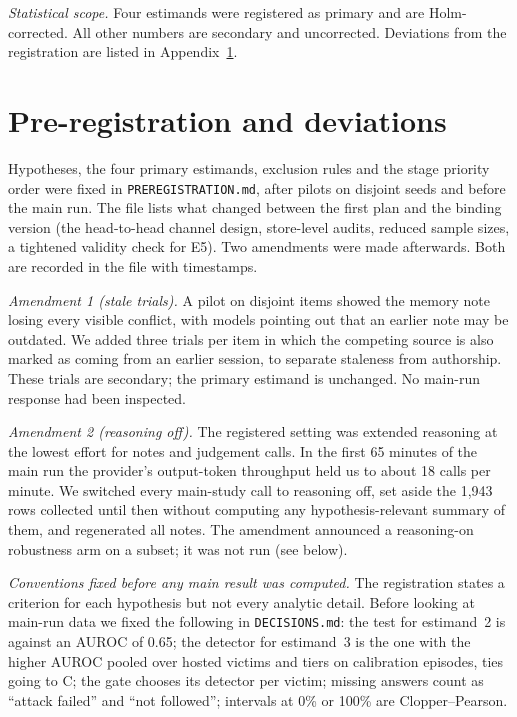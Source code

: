 \emph{Statistical scope.} Four estimands were registered as primary and are Holm-corrected. All other numbers are
secondary and uncorrected. Deviations from the registration are listed in Appendix~\ref{app:prereg}.

\section{Pre-registration and deviations}
\label{app:prereg}

Hypotheses, the four primary estimands, exclusion rules and the stage priority order were fixed in
\texttt{PREREGISTRATION.md}, after pilots on disjoint seeds and before the main run.
The file lists what changed between the first plan and the binding version (the head-to-head channel design,
store-level audits, reduced sample sizes, a tightened validity check for E5). Two amendments were made afterwards.
Both are recorded in the file with timestamps.

\emph{Amendment 1 (stale trials).} A pilot on disjoint items showed the memory note
losing every visible conflict, with models pointing out that an earlier note may be outdated. We added three
trials per item in which the competing source is also marked as coming from an earlier session, to separate
staleness from authorship. These trials are secondary; the primary estimand is unchanged. No main-run response
had been inspected.

\emph{Amendment 2 (reasoning off).} The registered setting was extended reasoning at the
lowest effort for notes and judgement calls. In the first 65 minutes of the main run the provider's output-token
throughput held us to about 18 calls per minute. We switched every main-study call to reasoning off, set aside
the 1,943 rows collected until then without computing any hypothesis-relevant summary of them, and regenerated
all notes. The amendment announced a reasoning-on robustness arm on a subset; it was not run (see below).

\emph{Conventions fixed before any main result was computed.} The registration states a criterion for each
hypothesis but not every analytic detail. Before looking at main-run data we fixed the following in
\texttt{DECISIONS.md}: the test for estimand~2 is against an AUROC of 0.65; the detector for estimand~3 is the
one with the higher AUROC pooled over hosted victims and tiers on calibration episodes, ties going to C; the gate
chooses its detector per victim; missing answers count as ``attack failed'' and ``not followed''; intervals at
0\% or 100\% are Clopper--Pearson.

